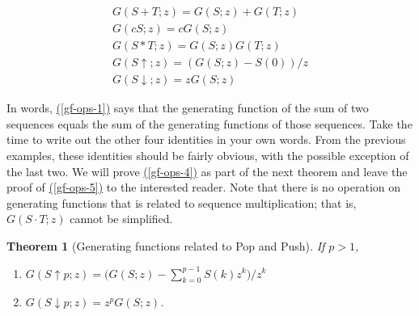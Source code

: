 \documentclass[10pt,]{book}
\theoremstyle{plain}
\newtheorem{theorem}{Theorem}[section]
\theoremstyle{definition}
\theoremstyle{definition}
\theoremstyle{definition}
\theoremstyle{definition}
\numberwithin{equation}{section}
\begin{document}
\begin{gather}
G(S+T;z)=G(S;z)+G(T;z)\label{gf-ops-1}\\
G(cS;z)=c G(S;z)\label{gf-ops-2}\\
 G(S*T;z)=G(S;z) G(T;z)\label{gf-ops-3}\\
 G(S\uparrow ;z)=(G(S;z)-S(0))/z\label{gf-ops-4}\\
 G(S\downarrow ;z)=z G(S;z)\label{gf-ops-5}
\end{gather}%
\par
In words, \hyperref[gf-ops-1]{(\ref{gf-ops-1})} says that the generating function of the sum of two sequences equals the sum of the generating functions of those sequences. Take
the time to write out the other four identities in your own words. From the previous examples, these identities should be fairly obvious, with the
possible exception of the last two. We will prove \hyperref[gf-ops-4]{(\ref{gf-ops-4})} as part of the next theorem and leave the proof of \hyperref[gf-ops-5]{(\ref{gf-ops-5})} to the interested reader. Note that
there is no operation on generating functions that is related to sequence multiplication; that is, \(G(S\cdot T;z)\) cannot be simplified.%
\begin{theorem}[Generating functions related to Pop and Push]\label{gf-of-pop-push}
If \(p > 1\),%
\par
\leavevmode%
\begin{enumerate}[label=\alph*]
\item\hypertarget{li-89}{}\(G(S\uparrow p;z) = (G(S;z) -\left.\sum_{k=0}^{p-1} S(k) z^k)/z^k\)%
\item\hypertarget{li-90}{} \(G(S\downarrow p;z) = z^p G(S;z)\).%
\end{enumerate}
%
\end{theorem}
\end{document}
